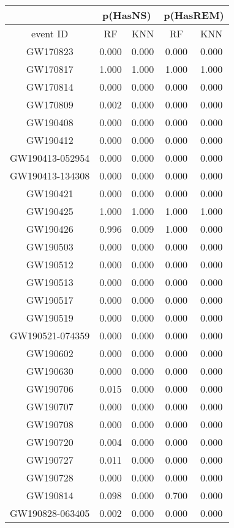 \begin{table*}[]
\centering
\begin{tabular}{c|cc|cc}
\hline
 & \multicolumn{2}{c}{p(HasNS)} & \multicolumn{2}{c}{p(HasREM)} \\
 \hline
event ID & RF & KNN & RF & KNN \\
\hline 
\hline
GW170823 &	0.000 &	0.000 & 0.000 &	0.000 \\
GW170817 &	1.000 &	1.000 & 1.000 & 1.000 \\
GW170814 &	0.000 &	0.000 & 0.000 & 0.000 \\
GW170809 &	0.002 & 0.000 & 0.000 & 0.000 \\
GW190408 &	0.000 &	0.000 & 0.000 & 0.000 \\
GW190412 &	0.000 &	0.000 & 0.000 & 0.000 \\
GW190413-052954 & 0.000  & 0.000 & 0.000 & 0.000 \\
GW190413-134308 & 0.000 &	0.000 & 0.000 & 0.000 \\
GW190421 &	0.000 &	0.000 & 0.000 & 0.000 \\
GW190425 &	1.000  & 1.000 &	1.000 & 1.000 \\
GW190426 &	0.996  & 0.009 & 1.000 & 0.000 \\
GW190503 &	0.000 &	0.000 & 0.000 & 0.000 \\
GW190512 &  0.000 &	0.000 & 0.000 & 0.000 \\
GW190513 &	0.000 &	0.000 & 0.000 & 0.000 \\
GW190517 &	0.000 &	0.000 & 0.000 & 0.000 \\
GW190519 &	0.000 &	0.000 & 0.000 & 0.000 \\
GW190521-074359  &	0.000 &	0.000 & 0.000 & 0.000 \\
GW190602 &	0.000 &	0.000 & 0.000 & 0.000 \\
GW190630 &	0.000 &	0.000 & 0.000 & 0.000 \\
GW190706 & 0.015 &	0.000 &	0.000 &	0.000 \\ 
GW190707 & 0.000 & 0.000 &	0.000 &	0.000 \\
GW190708 & 0.000 &	0.000 &	0.000 &	0.000 \\
GW190720 & 0.004 &	0.000 &	0.000 &	0.000 \\
GW190727 & 0.011 &	0.000 &	0.000 &	0.000 \\
GW190728 & 0.000 &	0.000 &	0.000 &	0.000 \\
GW190814 & 0.098 &	0.000 &	0.700 & 0.000 \\
GW190828-063405 & 0.002 &	0.000 &	0.000 & 0.000 \\

\end{tabular}
\end{table*}
